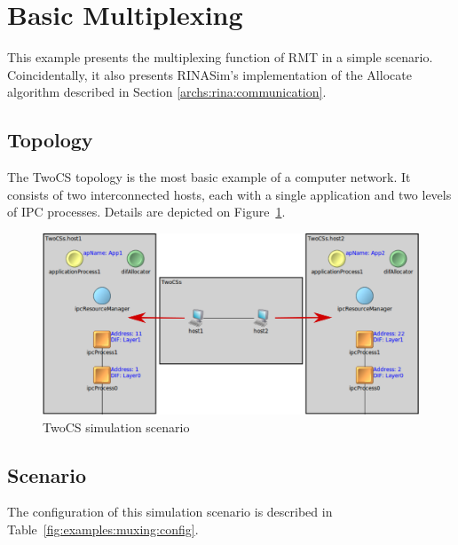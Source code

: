     \section{Basic Multiplexing}

        This example presents the multiplexing function of RMT in a simple scenario. Coincidentally, it also presents RINASim's implementation of the Allocate algorithm described in Section \ref{archs:rina:communication}.

        \subsection{Topology}

            The TwoCS topology is the most basic example of a computer network. It consists of two interconnected hosts, each with a single application and two levels of IPC processes. Details are depicted on Figure~\ref{fig:examples:muxing:events:topology}.

            \begin{figure}[H]
                \begin{center}
                    \includegraphics[width=\textwidth]{fig/tests_twocs.png}
                  \caption{TwoCS simulation scenario}
                  \label{fig:examples:muxing:events:topology}
                \end{center}
            \end{figure}

        \subsection{Scenario}

            The configuration of this simulation scenario is described in Table~\ref{fig:examples:muxing:config}.

